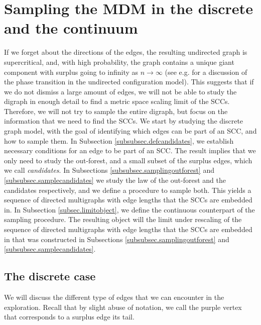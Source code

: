 \section{Sampling the MDM in the discrete and the continuum}
If we forget about the directions of the edges, the resulting undirected graph is supercritical, and, with high probability, the graph contains a unique giant component with surplus going to infinity as $n\to \infty$ (see e.g. \cite{molloyCriticalPointRandom1995,Molloy1998,Janson2009} for a discussion of the phase transition in the undirected configuration model). This suggests that if we do not dismiss a large amount of edges, we will not be able to study the digraph in enough detail to find a metric space scaling limit of the SCCs. Therefore, we will not try to sample the entire digraph, but focus on the information that we need to find the SCCs. We start by studying the discrete graph model, with the goal of identifying which edges can be part of an SCC, and how to sample them. In Subsection \ref{subsubsec.defcandidates}, we establish necessary conditions for an edge to be part of an SCC. The result implies that we only need to study the out-forest, and a small subset of the surplus edges, which we call \emph{candidates}. In Subsections \ref{subsubsec.samplingoutforest} and \ref{subsubsec.samplecandidates} we study the law of the out-forest and the candidates respectively, and we define a procedure to sample both. This yields a sequence of directed multigraphs with edge lengths that the SCCs are embedded in.  
In Subsection \ref{subsec.limitobject}, we define the continuous counterpart of the sampling procedure. The resulting object will the limit under rescaling of the sequence of directed multigraphs with edge lengths that the SCCs are embedded in that was constructed in Subsections \ref{subsubsec.samplingoutforest} and \ref{subsubsec.samplecandidates}. 
\subsection{The discrete case}\label{subsec.discrete}
We will discuss the different type of edges that we can encounter in the exploration. Recall that by slight abuse of notation, we call the purple vertex that corresponds to a surplus edge its tail.

